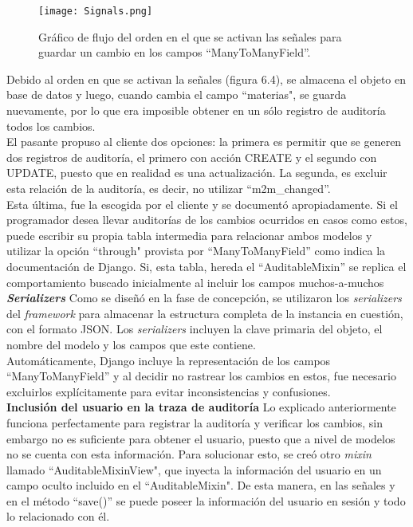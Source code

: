 \begin{figure}[h]
\centering
\texttt{[image: Signals.png]}
\caption{Gráfico de flujo del orden en el que se activan las señales para guardar un cambio en los campos “ManyToManyField”.}
\label{fig:figura6.4}
\end{figure}

Debido al orden en que se activan la señales (figura 6.4), se almacena el objeto en base de datos y luego, cuando cambia el campo “materias", se guarda nuevamente, por lo que era imposible obtener en un sólo registro de auditoría todos los cambios.\\

El pasante propuso al cliente dos opciones: la primera es permitir que se generen dos registros de auditoría, el primero con acción CREATE y el segundo con UPDATE, puesto que en realidad es una actualización. La segunda, es excluir esta relación de la auditoría, es decir, no utilizar “m2m\_changed”.\\

Esta última, fue la escogida por el cliente y se documentó apropiadamente. Si el programador desea llevar auditorías de los cambios ocurridos en casos como estos, puede escribir su propia tabla intermedia para relacionar ambos modelos y utilizar la opción “through" provista por “ManyToManyField” como indica la documentación de Django. Si, esta tabla, hereda el “AuditableMixin” se replica el comportamiento buscado inicialmente al incluir los campos muchos-a-muchos\\

\textbf{\textit{Serializers}}  Como se diseñó en la fase de concepción, se utilizaron los \textit{serializers} del \textit{framework} para almacenar la estructura completa de la instancia en cuestión, con el formato JSON. Los \textit{serializers} incluyen la clave primaria del objeto, el nombre del modelo y los campos que este contiene.\\

Automáticamente, Django incluye la representación de los campos “ManyToManyField” y al decidir no rastrear los cambios en estos, fue necesario excluirlos explícitamente para evitar inconsistencias y confusiones.\\

\textbf{Inclusión del usuario en la traza de auditoría}  Lo explicado anteriormente funciona perfectamente para registrar la auditoría y verificar los cambios, sin embargo no es suficiente para obtener el usuario, puesto que a nivel de modelos no se cuenta con esta información. Para solucionar esto, se creó otro \textit{mixin} llamado “AuditableMixinView", que inyecta la información del usuario en un campo oculto incluido en el “AuditableMixin". De esta manera, en las señales y en el método “save()” se  puede poseer la información del usuario en sesión y todo lo relacionado con él.

